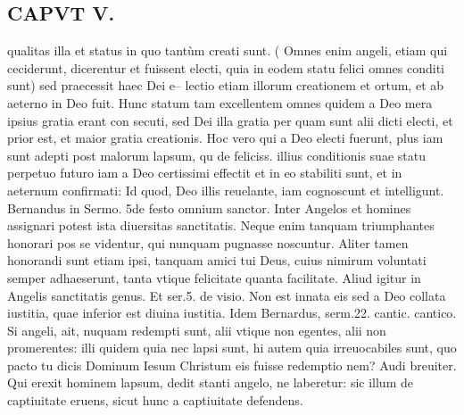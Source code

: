 \documentclass{article}
\begin{document}
\begin{pages}
\section*{CAPVT  V. }
\marginpar{[ p.335 ]}\pstart qualitas illa et status in quo tantùm creati sunt. ( Omnes enim angeli, etiam qui ceciderunt, dicerentur et fuissent electi, quia in eodem statu felici omnes conditi sunt) sed praecessit haec Dei e-- lectio etiam illorum creationem et ortum, et ab aeterno in Deo fuit. Hunc statum tam excellentem omnes quidem a Deo mera ipsius gratia erant con secuti, sed Dei illa gratia per quam sunt alii dicti electi, et prior est, et maior gratia creationis. Hoc vero qui a Deo electi fuerunt, plus iam sunt adepti post malorum lapsum, qu de feliciss. illius conditionis suae statu perpetuo futuro iam a Deo certissimi effectit et in eo stabiliti sunt, et in aeternum confirmati: Id quod, Deo illis reuelante, iam cognoscunt et intelligunt. Bernandus in Sermo. 5de festo omnium sanctor. Inter Angelos et homines assignari potest ista diuersitas sanctitatis. Neque enim tanquam triumphantes honorari pos se videntur, qui nunquam pugnasse noscuntur. Aliter tamen honorandi sunt etiam ipsi, tanquam amici tui Deus, cuius nimirum voluntati semper adhaeserunt, tanta vtique felicitate quanta facilitate. Aliud igitur in Angelis sanctitatis genus. Et ser.5. de visio. Non est innata eis sed a Deo collata iustitia, quae inferior est diuina iustitia. Idem Bernardus, serm.22. cantic. cantico. Si angeli, ait, nuquam redempti sunt, alii vtique non egentes, alii non promerentes: illi quidem quia nec lapsi sunt, hi autem quia irreuocabiles sunt, quo pacto tu dicis Dominum Iesum Christum eis fuisse redemptio nem? Audi breuiter. Qui erexit hominem lapsum, dedit stanti angelo, ne laberetur: sic illum de captiuitate eruens, sicut hunc a captiuitate defendens.  \pend

\end{pages}
\end{document}
